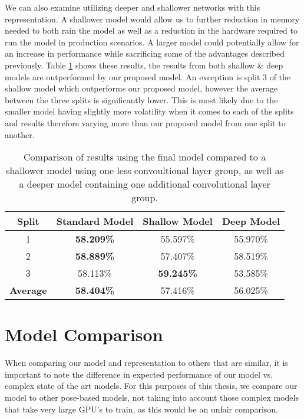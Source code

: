 We can also examine utilizing deeper and shallower networks with this representation. A shallower model would allow us to further reduction in memory needed to both rain the model as well as a reduction in the hardware required to run the model in production scenarios. A larger model could potentially allow for an increase in performance while sacrificing some of the advantages described previously. Table \ref{tab:acc-results-v-shallow-deep} shows these results, the results from both shallow \& deep models are outperformed by our proposed model. An exception is split 3 of the shallow model which outperforms our proposed model, however the average between the three splits is significantly lower. This is most likely due to the smaller model having slightly more volatility when it comes to each of the splits and results therefore varying more than our proposed model from one split to another.

\begin{table}[ht]
	\centering
	\begin{tabular}{||c c c c||} 
		\hline
		\textbf{Split} & \textbf{Standard Model} & \textbf{Shallow Model} & \textbf{Deep Model} \\ [0.5ex] 
		\hline\hline
		1 & \textbf{58.209\%} & 55.597\% & 55.970\% \\ 
		\hline
		2 & \textbf{58.889\%} & 57.407\% & 58.519\% \\
		\hline
		3 & 58.113\% & \textbf{59.245\%} & 53.585\% \\
		\hline
		\hline
		\textbf{Average} & \textbf{58.404\%} & 57.416\% & 56.025\% \\
		\hline
	\end{tabular}
	\caption{Comparison of results using the final model compared to a shallower model using one less convoultional layer group, as well as a deeper model containing one additional convolutional layer group.}
	\label{tab:acc-results-v-shallow-deep}
\end{table}

\section{Model Comparison}

When comparing our model and representation to others that are similar, it is important to note the difference in expected performance of our model vs. complex state of the art models. For this purposes of this thesis, we compare our model to other pose-based models, not taking into account those complex models that take very large GPU's to train, as this would be an unfair comparison.

